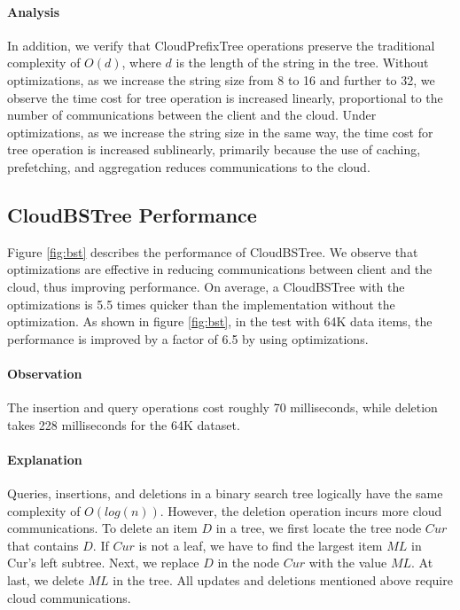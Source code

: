 \documentclass[10pt, conference, compsocconf]{IEEEtran}
\begin{document}
 \paragraph{Analysis} In addition, we verify that CloudPrefixTree operations preserve the traditional complexity of $O(d)$, 
 where $d$ is the length of the string in the tree.
 Without optimizations, as we increase the string size from 8 to 16 and further to 32, we observe the time cost for 
 tree operation is increased linearly, proportional to the number of communications between the client and the cloud. 
 Under optimizations, as we increase the string size in the same way, the time cost for 
 tree operation is increased sublinearly, primarily because the use of caching, prefetching, and aggregation reduces communications to the cloud.
 






\subsection{CloudBSTree Performance}
Figure \ref{fig:bst} describes the performance of CloudBSTree.
We observe that optimizations are effective in
reducing communications between client and the cloud, thus improving performance.
On average, a CloudBSTree with the optimizations is 5.5 times quicker than the 
implementation without the optimization.
As shown in figure \ref{fig:bst}, in the test with 64K data items, 
the performance is improved by a factor of 6.5 by using optimizations.

\paragraph{Observation}The insertion and 
query operations cost roughly 70 milliseconds, 
while deletion takes 228 milliseconds for the 64K dataset.
\paragraph{Explanation}
Queries, insertions, and deletions in a binary search tree logically have the same complexity of $O(log(n))$.
However, the deletion operation incurs more cloud communications. 
To delete an item $D$ in a tree, we first locate the tree node $Cur$ that contains $D$.
If $Cur$ is not a leaf, we have to find the largest item $ML$ in Cur's left subtree.
Next, we replace $D$ in the node $Cur$ with the value $ML$. At last, we delete $ML$ in the tree.
All updates and deletions mentioned above require cloud communications.
\end{document}

